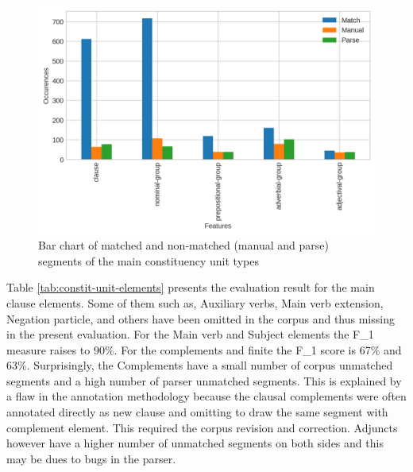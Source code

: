\begin{figure}[!ht]
    \centering
    \includegraphics[width=.7\textwidth]{evaluation-results/figures/accuracy-syntactic-group-types}
    \caption{Bar chart of matched and non-matched (manual and parse) segments of the main constituency unit types}
    \label{fig:constit-unit-types}
\end{figure}

Table \ref{tab:constit-unit-elements} presents the evaluation result for the main clause elements. Some of them such as, Auxiliary verbs, Main verb extension, Negation particle, and others have been omitted in the corpus and thus missing in the present evaluation. For the Main verb and Subject elements the F_1 measure raises to 90\%. For the complements and finite the F_1 score is 67\% and 63\%. Surprisingly, the Complements have a small number of corpus unmatched segments and a high number of parser unmatched segments. This is explained by a flaw in the annotation methodology because the clausal complements were often annotated directly as new clause and omitting to draw the same segment with complement element. This required the corpus revision and correction. Adjuncts however have a higher number of unmatched segments on both sides and this may be dues to bugs in the parser.

